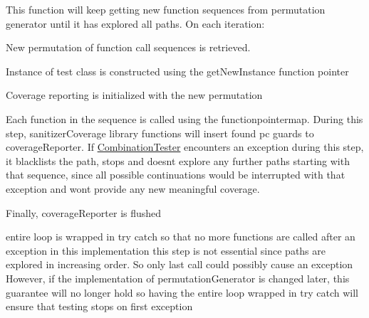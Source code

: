 This function will keep getting new function sequences from permutation generator until it has explored all paths. On each iteration\+:
\begin{DoxyEnumerate}
\item New permutation of function call sequences is retrieved.
\item Instance of test class is constructed using the get\+New\+Instance function pointer
\item Coverage reporting is initialized with the new permutation
\item Each function in the sequence is called using the functionpointermap. During this step, sanitizer\+Coverage library functions will insert found pc guards to coverage\+Reporter. If \hyperlink{classCombinationTester}{Combination\+Tester} encounters an exception during this step, it blacklists the path, stops and doesn\textquotesingle{}t explore any further paths starting with that sequence, since all possible continuations would be interrupted with that exception and won\textquotesingle{}t provide any new meaningful coverage.
\item Finally, coverage\+Reporter is flushed 
\end{DoxyEnumerate}entire loop is wrapped in try catch so that no more functions are called after an exception in this implementation this step is not essential since paths are explored in increasing order. So only last call could possibly cause an exception However, if the implementation of permutation\+Generator is changed later, this guarantee will no longer hold so having the entire loop wrapped in try catch will ensure that testing stops on first exception